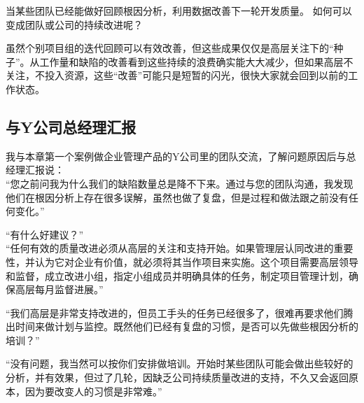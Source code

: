 当某些团队已经能做好回顾根因分析，利用数据改善下一轮开发质量。
如何可以变成团队或公司的持续改进呢？



虽然个别项目组的迭代回顾可以有效改善，但这些成果仅仅是高层关注下的“种子”。从工作量和缺陷的改善看到这些持续的浪费确实能大大减少，但如果高层不关注，不投入资源，这些“改善”可能只是短暂的闪光，很快大家就会回到以前的工作状态。

\hypertarget{ux4e0eyux516cux53f8ux603bux7ecfux7406ux6c47ux62a5}{%
\subsection{与Y公司总经理汇报}\label{ux4e0eyux516cux53f8ux603bux7ecfux7406ux6c47ux62a5}}

我与本章第一个案例做企业管理产品的Y公司里的团队交流，了解问题原因后与总经理汇报说：\\
“您之前问我为什么我们的缺陷数量总是降不下来。通过与您的团队沟通，我发现他们在根因分析上存在很多误解，虽然也做了复盘，但是过程和做法跟之前没有任何变化。”

``有什么好建议？''\\
“任何有效的质量改进必须从高层的关注和支持开始。如果管理层认同改进的重要性，并认为它对企业有价值，就必须将其当作项目来实施。这个项目需要高层领导和监督，成立改进小组，指定小组成员并明确具体的任务，制定项目管理计划，确保高层每月监督进展。”

“我们高层是非常支持改进的，但员工手头的任务已经很多了，很难再要求他们腾出时间来做计划与监控。既然他们已经有复盘的习惯，是否可以先做些根因分析的培训？”

``没有问题，我当然可以按你们安排做培训。开始时某些团队可能会做出些较好的分析，并有效果，但过了几轮，因缺乏公司持续质量改进的支持，不久又会返回原本，因为要改变人的习惯是非常难。''

